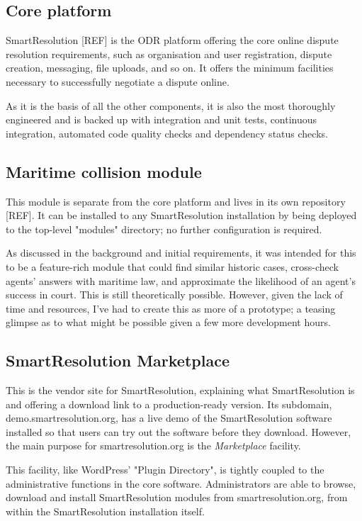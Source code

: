 \subsection{Core platform}

SmartResolution [REF] is the ODR platform offering the core online dispute resolution requirements, such as organisation and user registration, dispute creation, messaging, file uploads, and so on. It offers the minimum facilities necessary to successfully negotiate a dispute online.

As it is the basis of all the other components, it is also the most thoroughly engineered and is backed up with integration and unit tests, continuous integration, automated code quality checks and dependency status checks.

\subsection{Maritime collision module}

This module is separate from the core platform and lives in its own repository [REF]. It can be installed to any SmartResolution installation by being deployed to the top-level "modules" directory; no further configuration is required.

As discussed in the background and initial requirements, it was intended for this to be a feature-rich module that could find similar historic cases, cross-check agents' answers with maritime law, and approximate the likelihood of an agent's success in court. This is still theoretically possible. However, given the lack of time and resources, I've had to create this as more of a prototype; a teasing glimpse as to what might be possible given a few more development hours.

\subsection{SmartResolution Marketplace}

This is the vendor site for SmartResolution, explaining what SmartResolution is and offering a download link to a production-ready version. Its subdomain, demo.smartresolution.org, has a live demo of the SmartResolution software installed so that users can try out the software before they download. However, the main purpose for smartresolution.org is the \emph{Marketplace} facility.

This facility, like WordPress' "Plugin Directory", is tightly coupled to the administrative functions in the core software. Administrators are able to browse, download and install SmartResolution modules from smartresolution.org, from within the SmartResolution installation itself.

